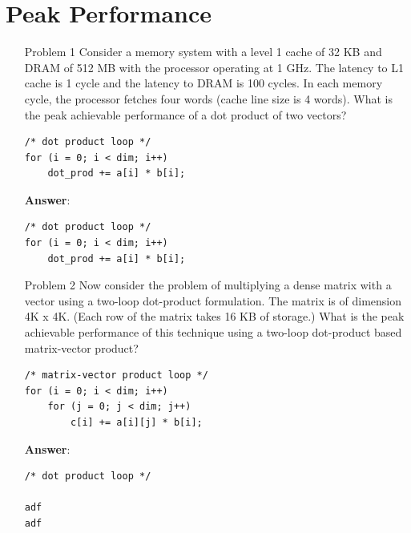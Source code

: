 \documentclass{sem5}
\author{Dilip Puri}
\begin{document}
\section*{Peak Performance}
\begin{enumerate}
\item[Problem 1] Consider a memory system with a level 1 cache of 32 KB and DRAM of 512 MB with the processor operating at 1 GHz. The latency to L1 cache is 1 cycle and the latency to DRAM is 100 cycles. In each memory cycle, the processor fetches four words (cache line size is 4 words). What is the peak achievable performance of a dot product of two vectors?
\lstset{language=C}
\begin{lstlisting}[frame=single]
/* dot product loop */
for (i = 0; i < dim; i++)
	dot_prod += a[i] * b[i];
\end{lstlisting}
\textbf{Answer}:
\lstset{language=C}
\begin{lstlisting}[frame=single]
/* dot product loop */
for (i = 0; i < dim; i++)
	dot_prod += a[i] * b[i];
\end{lstlisting}
\item[Problem 2] Now consider the problem of multiplying a dense matrix with a vector using a two-loop dot-product formulation. The matrix is of dimension 4K x 4K. (Each row of the matrix takes 16 KB of storage.) What is the peak achievable performance of this technique using a two-loop dot-product based matrix-vector product?
\lstset{language=C}
\begin{lstlisting}[frame=single]
/* matrix-vector product loop */
for (i = 0; i < dim; i++)
	for (j = 0; j < dim; j++)
		c[i] += a[i][j] * b[i];
\end{lstlisting}
\textbf{Answer}:
\lstset{language=C}
\begin{lstlisting}[frame=single]
/* dot product loop */

adf
adf
\end{lstlisting}
\end{enumerate}
\end{document}
